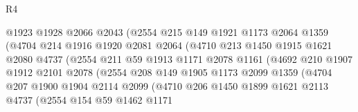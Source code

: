 \begin{lexlean}{R4}
\begin{coremodule}
                            @1923
                            @1928
                            @2066
                            @2043
                            (@2554
                              @215
                              @149
                              @1921
                              @1173
                              @2064
                              @1359
                              (@4704
                                @214
                                @1916
                                @1920
                                @2081
                                @2064
                                (@4710
                                  @213
                                  @1450
                                  @1915
                                  @1621
                                  @2080
                                  @4737
                                  (@2554
                                    @211
                                    @59
                                    @1913
                                    @1171
                                    @2078
                                    @1161
                                    (@4692
                                      @210
                                      @1907
                                      @1912
                                      @2101
                                      @2078
                                      (@2554
                                        @208
                                        @149
                                        @1905
                                        @1173
                                        @2099
                                        @1359
                                        (@4704
                                          @207
                                          @1900
                                          @1904
                                          @2114
                                          @2099
                                          (@4710
                                            @206
                                            @1450
                                            @1899
                                            @1621
                                            @2113
                                            @4737
                                            (@2554
                                              @154
                                              @59
                                              @1462
                                              @1171

\end{coremodule}
\end{lexlean}
